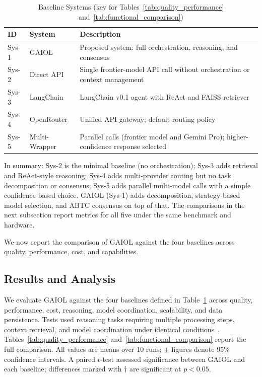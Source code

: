 \documentclass{iopjournal}
\begin{document}
\begin{table}[!ht]
\centering
\caption{Baseline Systems (key for Tables~\ref{tab:quality_performance} and~\ref{tab:functional_comparison})}
\label{tab:baselines}
\begin{tabular}{ll>{\raggedright\arraybackslash}p{5.6cm}}
\toprule
ID & System & Description \\
\midrule
Sys-1 & GAIOL & Proposed system: full orchestration, reasoning, and consensus \\
Sys-2 & Direct API & Single frontier-model API call without orchestration or context management \\
Sys-3 & LangChain & LangChain v0.1 agent with ReAct and FAISS retriever \\
Sys-4 & OpenRouter & Unified API gateway; default routing policy \\
Sys-5 & Multi-Wrapper & Parallel calls (frontier model and Gemini Pro); higher-confidence response selected \\
\bottomrule
\end{tabular}
\end{table}

In summary: Sys-2 is the minimal baseline (no orchestration); Sys-3 adds retrieval and ReAct-style reasoning; Sys-4 adds multi-provider routing but no task decomposition or consensus; Sys-5 adds parallel multi-model calls with a simple confidence-based choice. GAIOL (Sys-1) adds decomposition, strategy-based model selection, and ABTC consensus on top of that. The comparisons in the next subsection report metrics for all five under the same benchmark and hardware.

We now report the comparison of GAIOL against the four baselines across quality, performance, cost, and capabilities.

\subsection{Results and Analysis}

We evaluate GAIOL against the four baselines defined in Table~\ref{tab:baselines} across quality, performance, cost, reasoning, model coordination, scalability, and data persistence. Tests used reasoning tasks requiring multiple processing steps, context retrieval, and model coordination under identical conditions~\cite{HolisticEval}. Tables~\ref{tab:quality_performance} and~\ref{tab:functional_comparison} report the full comparison. All values are means over 10 runs; $\pm$ figures denote 95\% confidence intervals. A paired $t$-test assessed significance between GAIOL and each baseline; differences marked with $\dagger$ are significant at $p < 0.05$.
\end{document}
